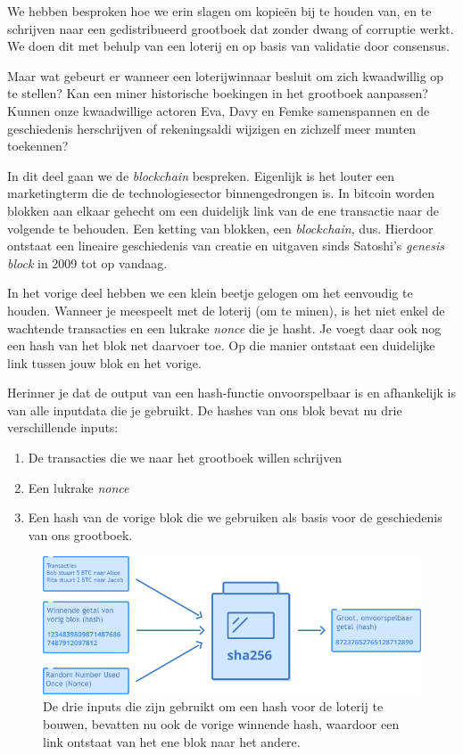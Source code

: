 \documentclass[
  letterpaper,
]{scrbook}
\begin{document}
We hebben besproken hoe we erin slagen om kopieën bij te houden van, en
te schrijven naar een gedistribueerd grootboek dat zonder dwang of
corruptie werkt. We doen dit met behulp van een loterij en op basis van
validatie door consensus.

Maar wat gebeurt er wanneer een loterijwinnaar besluit om zich
kwaadwillig op te stellen? Kan een miner historische boekingen in het
grootboek aanpassen? Kunnen onze kwaadwillige actoren Eva, Davy en Femke
samenspannen en de geschiedenis herschrijven of rekeningsaldi wijzigen
en zichzelf meer munten toekennen?

In dit deel gaan we de \emph{blockchain} bespreken. Eigenlijk is het
louter een marketingterm die de technologiesector binnengedrongen is. In
bitcoin worden blokken aan elkaar gehecht om een duidelijk link van de
ene transactie naar de volgende te behouden. Een ketting van blokken,
een \emph{blockchain}, dus. Hierdoor ontstaat een lineaire geschiedenis
van creatie en uitgaven sinds Satoshi's \emph{genesis block} in 2009 tot
op vandaag.

In het vorige deel hebben we een klein beetje gelogen om het eenvoudig
te houden. Wanneer je meespeelt met de loterij (om te minen), is het
niet enkel de wachtende transacties en een lukrake \emph{nonce} die je
hasht. Je voegt daar ook nog een hash van het blok net daarvoer toe. Op
die manier ontstaat een duidelijke link tussen jouw blok en het vorige.

Herinner je dat de output van een hash-functie onvoorspelbaar is en
afhankelijk is van alle inputdata die je gebruikt. De hashes van ons
blok bevat nu drie verschillende inputs:

\begin{enumerate}
\def\labelenumi{\arabic{enumi}.}
\item
  De transacties die we naar het grootboek willen schrijven
\item
  Een lukrake \emph{nonce}
\item
  Een hash van de vorige blok die we gebruiken als basis voor de
  geschiedenis van ons grootboek.
\end{enumerate}

\begin{figure}

{\centering \includegraphics{./images/fig11.png}

}

\caption{\label{fig-figuur11}De drie inputs die zijn gebruikt om een
hash voor de loterij te bouwen, bevatten nu ook de vorige winnende hash,
waardoor een link ontstaat van het ene blok naar het andere.}

\end{figure}
\end{document}
